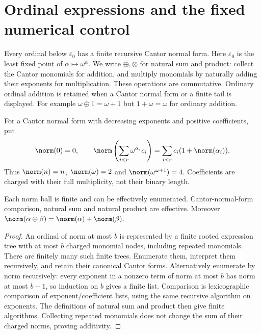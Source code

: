 \section{Ordinal expressions and the fixed numerical control}\label{sec:ordinals}

Every ordinal below $\varepsilon_0$ has a finite recursive Cantor normal
form.  Here $\varepsilon_0$ is the least fixed point of
$\alpha\mapsto\omega^\alpha$.  We write $\oplus,\otimes$ for natural
sum and product: collect the Cantor monomials for addition, and multiply
monomials by naturally adding their exponents for multiplication.  These
operations are commutative.  Ordinary ordinal addition is retained when
a Cantor normal form or a finite tail is displayed.  For example
$\omega\oplus1=\omega+1$ but $1+\omega=\omega$ for ordinary addition.

\begin{definition}\label{def:norm}
For a Cantor normal form with decreasing exponents and positive coefficients,
put
\[
 \norm(0)=0,\qquad
 \norm\left(\sum_{i<r}\omega^{\alpha_i}c_i\right)
       =\sum_{i<r}c_i(1+\norm(\alpha_i)).
\]
Thus $\norm(n)=n$, $\norm(\omega)=2$ and
$\norm(\omega^{\omega+1})=4$.  Coefficients are charged with their full
multiplicity, not their binary length.
\end{definition}

\begin{lemma}\label{lem:finite-balls}
Each norm ball is finite and can be effectively enumerated.  Cantor-normal-form
comparison, natural sum and natural product are effective.  Moreover
$\norm(\alpha\oplus\beta)=\norm(\alpha)+\norm(\beta)$.
\end{lemma}
\begin{proof}
An ordinal of norm at most $b$ is represented by a finite rooted expression
tree with at most $b$ charged monomial nodes, including repeated monomials.
There are finitely many such finite trees.  Enumerate them, interpret them
recursively, and retain their canonical Cantor forms.  Alternatively enumerate
by norm recursively: every exponent in a nonzero term of norm at most $b$
has norm at most $b-1$, so induction on $b$ gives a finite list.
Comparison is lexicographic comparison of exponent/coefficient lists, using
the same recursive algorithm on exponents.  The definitions of natural sum
and product then give finite algorithms.  Collecting repeated monomials does
not change the sum of their charged norms, proving additivity.
\end{proof}

